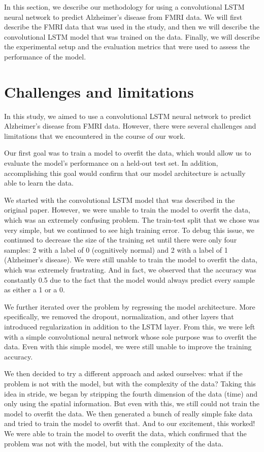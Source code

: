 \documentclass[10pt]{article}
\begin{document}
	In this section, we describe our methodology for using a convolutional LSTM neural network to predict Alzheimer's disease from FMRI data. We will first describe the FMRI data that was used in the study, and then we will describe the convolutional LSTM model that was trained on the data. Finally, we will describe the experimental setup and the evaluation metrics that were used to assess the performance of the model.

	\section{Challenges and limitations}

	In this study, we aimed to use a convolutional LSTM neural network to predict Alzheimer's disease from FMRI data. However, there were several challenges and limitations that we encountered in the course of our work.

	Our first goal was to train a model to overfit the data, which would allow us to evaluate the model's performance on a held-out test set. In addition, accomplishing this goal would confirm that our model architecture is actually able to learn the data.

	We started with the convolutional LSTM model that was described in the original paper. However, we were unable to train the model to overfit the data, which was an extremely confusing problem. The train-test split that we chose was very simple, but we continued to see high training error. To debug this issue, we continued to decrease the size of the training set until there were only four samples: 2 with a label of 0 (cognitively normal) and 2 with a label of 1 (Alzheimer's disease). We were still unable to train the model to overfit the data, which was extremely frustrating. And in fact, we observed that the accuracy was constantly 0.5 due to the fact that the model would always predict every sample as either a 1 or a 0.

	We further iterated over the problem by regressing the model architecture. More specifically, we removed the dropout, normalization, and other layers that introduced regularization in addition to the LSTM layer. From this, we 
	were left with a simple convolutional neural network whose sole purpose was to overfit the data. Even with this simple model, we were still unable to improve the training accuracy. 

	We then decided to try a different approach and asked ourselves: what if the problem is not with the model, but with the complexity of the data? Taking this idea in stride, we began by stripping the fourth dimension of the data (time) and only using the spatial information. But even with this, we still could not train the model to overfit the data. We then generated a bunch of really simple fake data and tried to train the model to overfit that. And to our excitement, this worked! We were able to train the model to overfit the data, which confirmed that the problem was not with the model, but with the complexity of the data.
\end{document}
